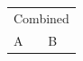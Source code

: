 \documentclass{article}
\begin{document}
\begin{tabular}{ll}
\multicolumn{2}{c}{Combined} \\
A & B
\end{tabular}
\end{document}
